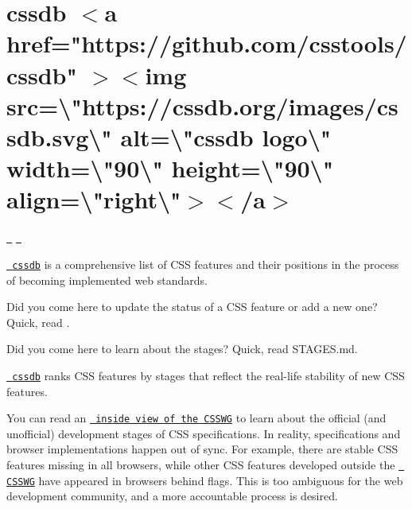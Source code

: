\chapter{cssdb \texorpdfstring{$<$}{<}a href="{}https\+://github.\+com/csstools/cssdb"{} \texorpdfstring{$>$}{>}\texorpdfstring{$<$}{<}img src=\textbackslash{}"{}https\+://cssdb.\+org/images/cssdb.\+svg\textbackslash{}"{} alt=\textbackslash{}"{}cssdb logo\textbackslash{}"{} width=\textbackslash{}"{}90\textbackslash{}"{} height=\textbackslash{}"{}90\textbackslash{}"{} align=\textbackslash{}"{}right\textbackslash{}"{}\texorpdfstring{$>$}{>}\texorpdfstring{$<$}{<}/a\texorpdfstring{$>$}{>}}
\hypertarget{md_node__modules_2cssdb_2README}{}\label{md_node__modules_2cssdb_2README}
\label{md_node__modules_2cssdb_2README_autotoc_md8836}%
%
 \href{https://www.npmjs.com/package/cssdb}{\texttt{ }} \href{https://github.com/csstools/cssdb/actions/workflows/test.yml}{\texttt{ }}

\href{https://github.com/csstools/cssdb}{\texttt{ cssdb}} is a comprehensive list of CSS features and their positions in the process of becoming implemented web standards.



Did you come here to update the status of a CSS feature or add a new one? Quick, read .

Did you come here to learn about the stages? Quick, read STAGES.md.



\href{https://github.com/csstools/cssdb}{\texttt{ cssdb}} ranks CSS features by stages that reflect the real-\/life stability of new CSS features.

You can read an \href{https://fantasai.inkedblade.net/weblog/2011/inside-csswg/process}{\texttt{ inside view of the CSSWG}} to learn about the official (and unofficial) development stages of CSS specifications. In reality, specifications and browser implementations happen out of sync. For example, there are stable CSS features missing in all browsers, while other CSS features developed outside the \href{https://wiki.csswg.org/spec}{\texttt{ CSSWG}} have appeared in browsers behind flags. This is too ambiguous for the web development community, and a more accountable process is desired. 